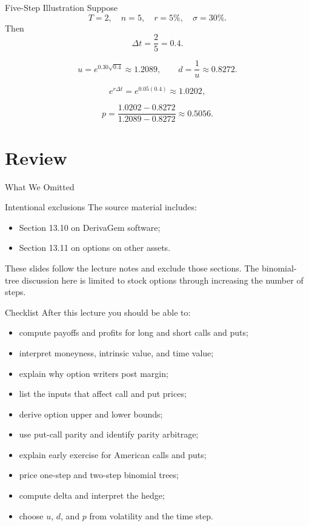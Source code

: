 \documentclass[aspectratio=169,11pt]{beamer}
\begin{document}
\begin{frame}{Five-Step Illustration}
    Suppose
    \[
        T=2,\quad n=5,\quad r=5\%,\quad \sigma=30\%.
    \]
    Then
    \[
        \Delta t=\frac{2}{5}=0.4.
    \]

    \[
        u=e^{0.30\sqrt{0.4}}\approx 1.2089,
        \qquad
        d=\frac{1}{u}\approx 0.8272.
    \]

    \[
        e^{r\Delta t}=e^{0.05(0.4)}\approx 1.0202,
    \]

    \[
        p=\frac{1.0202-0.8272}{1.2089-0.8272}\approx 0.5056.
    \]
\end{frame}

\section{Review}

\begin{frame}{What We Omitted}
    \begin{block}{Intentional exclusions}
        The source material includes:
        \begin{itemize}
            \item Section 13.10 on DerivaGem software;
            \item Section 13.11 on options on other assets.
        \end{itemize}
    \end{block}

    \vspace{0.5em}
    These slides follow the lecture notes and exclude those sections.
    The binomial-tree discussion here is limited to stock options through increasing the number of steps.
\end{frame}

\begin{frame}{Checklist}
    After this lecture you should be able to:
    \begin{itemize}
        \item compute payoffs and profits for long and short calls and puts;
        \item interpret moneyness, intrinsic value, and time value;
        \item explain why option writers post margin;
        \item list the inputs that affect call and put prices;
        \item derive option upper and lower bounds;
        \item use put-call parity and identify parity arbitrage;
        \item explain early exercise for American calls and puts;
        \item price one-step and two-step binomial trees;
        \item compute delta and interpret the hedge;
        \item choose \(u\), \(d\), and \(p\) from volatility and the time step.
    \end{itemize}
\end{frame}
\end{document}
